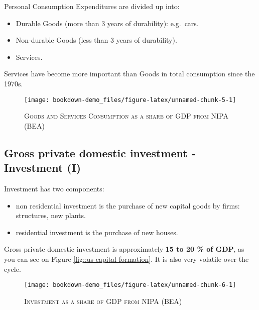 \documentclass[]{book}
\providecommand{\tightlist}{%
  \setlength{\itemsep}{0pt}\setlength{\parskip}{0pt}}
\theoremstyle{definition}
\theoremstyle{definition}
\theoremstyle{definition}
\theoremstyle{remark}
\begin{document}
Personal Consumption Expenditures are divided up into:

\begin{itemize}
\tightlist
\item
  Durable Goods (more than 3 years of durability): e.g.~cars.
\item
  Non-durable Goods (less than 3 years of durability).
\item
  Services.
\end{itemize}

Services have become more important than Goods in total consumption
since the 1970s.

\begin{figure}

{\centering \texttt{[image: bookdown-demo\_files/figure-latex/unnamed-chunk-5-1]} 

}

\caption{\label{fig::us-gdp}\textsc{Goods and Services Consumption as a share of GDP from NIPA (BEA)}}\label{fig:unnamed-chunk-5}
\end{figure}

\hypertarget{inv}{\subsection{Gross private domestic investment -
Investment (I)}\label{inv}}

Investment has two components:

\begin{itemize}
\tightlist
\item
  non residential investment is the purchase of new capital goods by
  firms: structures, new plants.
\item
  residential investment is the purchase of new houses.
\end{itemize}

Gross private domestic investment is approximately \textbf{15 to 20 \%
of GDP}, as you can see on Figure \ref{fig::us-capital-formation}. It is
also very volatile over the cycle.

\begin{figure}

{\centering \texttt{[image: bookdown-demo\_files/figure-latex/unnamed-chunk-6-1]} 

}

\caption{\label{fig::us-capital-formation}\textsc{Investment as a share of GDP from NIPA (BEA)}}\label{fig:unnamed-chunk-6}
\end{figure}
\end{document}
